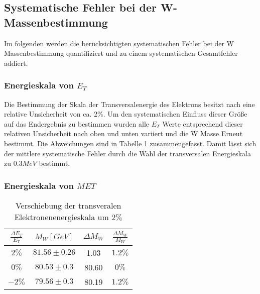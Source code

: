 \documentclass[a4paper,12pt]{article}
\begin{document}
\subsection{Systematische Fehler bei der W-Massenbestimmung}
Im folgenden werden die berücksichtigten systematischen Fehler bei der W Massenbestimmung quantifiziert und zu einem systematischen Gesamtfehler 
addiert.
\subsubsection*{Energieskala von $E_{T}$}
Die Bestimmung der Skala der Transversalenergie des Elektrons besitzt nach \cite{Abachi:1996ey} eine relative Unsicherheit von ca. $2\%$. Um den systematischen Einfluss
dieser Größe auf das Endergebnis zu bestimmen wurden alle $E_{T}$ Werte entsprechend dieser relativen Unsicherheit nach oben und unten variiert und die
W Masse Erneut bestimmt. Die Abweichungen sind in Tabelle \ref{tab:syset} zusammengefasst. Damit lässt sich der mittlere systematische Fehler durch die 
Wahl der transversalen Energieskala zu $0.3MeV$ bestimmt.
\subsubsection*{Energieskala von $MET$}

\begin{table}
	\centering
	\begin{tabular}{c| c c c}
		$\frac{\Delta E_{T}}{E_{T}}$ & $M_{W} [GeV]$ & $\Delta M_{W}$ &$\frac{\Delta M_{W}}{M_{W}}$\\
		\hline
		$2\%$ & $81.56\pm 0.26$ & 1.03 & $1.2\%$\\
		$0\%$ & $80.53\pm 0.3$ & 80.60 & $0\%$ \\
		$-2\%$ & $79.56\pm 0.3$ & 80.19 &$1.2\%$ 
	\end{tabular}
	\caption{Verschiebung der transveralen Elektronenenergieskala um $2\%$}
	\label{tab:syset}
\end{table}
\end{document}
